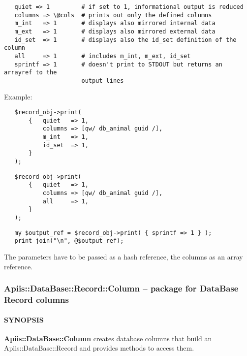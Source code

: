 \begin{verbatim}
   quiet => 1         # if set to 1, informational output is reduced
   columns => \@cols  # prints out only the defined columns
   m_int   => 1       # displays also mirrored internal data
   m_ext   => 1       # displays also mirrored external data
   id_set  => 1       # displays also the id_set definition of the column
   all     => 1       # includes m_int, m_ext, id_set
   sprintf => 1       # doesn't print to STDOUT but returns an arrayref to the
                      output lines
\end{verbatim}


Example:

\begin{verbatim}
   $record_obj->print(
       {   quiet   => 1,
           columns => [qw/ db_animal guid /],
           m_int   => 1,
           id_set  => 1,
       }
   );
\end{verbatim}
\begin{verbatim}
   $record_obj->print(
       {   quiet   => 1,
           columns => [qw/ db_animal guid /],
           all     => 1,
       }
   );
\end{verbatim}
\begin{verbatim}
   my $output_ref = $record_obj->print( { sprintf => 1 } );
   print join("\n", @$output_ref);
\end{verbatim}


The parameters have to be passed as a hash reference, the columns as an array
reference.

\subsubsection{Apiis::DataBase::Record::Column -- package for DataBase Record columns\label{Apiis::DataBase::Record::Column_--_package_for_DataBase_Record_columns}}




\paragraph*{SYNOPSIS\label{Apiis::DataBase::Record::Column_--_package_for_DataBase_Record_columns_SYNOPSIS}}


\textbf{Apiis::DataBase::Column} creates database columns that build an
Apiis::DataBase::Record and provides methods to access them.

